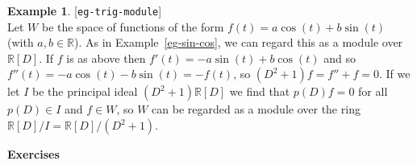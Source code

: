 \documentclass{amsart}
\newcommand{\lbl}[1]{\label{#1}\textup{[\texttt{#1}]}\ \\}
\newcommand{\lbl}{\label}
\newcommand{\R}         {{\mathbb{R}}}
\renewcommand{\:}{\colon}
\theoremstyle{definition}
\newtheorem{example}[theorem]{Example}
\begin{document}
\begin{example}\lbl{eg-trig-module}
 Let $W$ be the space of functions of the form
 $f(t)=a\cos(t)+b\sin(t)$ (with $a,b\in\R$).  As in
 Example~\ref{eg-sin-cos}, we can regard this as a module over
 $\R[D]$.  If $f$ is as above then $f'(t)=-a\sin(t)+b\cos(t)$ and so
 $f''(t)=-a\cos(t)-b\sin(t)=-f(t)$, so $(D^2+1)f=f''+f=0$.  If we let
 $I$ be the principal ideal $(D^2+1)\R[D]$ we find that $p(D)f=0$ for
 all $p(D)\in I$ and $f\in W$, so $W$ can be regarded as a module over
 the ring $\R[D]/I=\R[D]/(D^2+1)$.  
\end{example}


\begin{center}
 \Large \textbf{Exercises}
\end{center}
\end{document}
